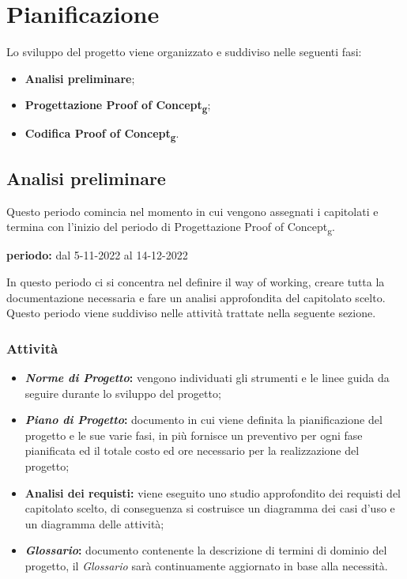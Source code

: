 \section{Pianificazione}
Lo sviluppo del progetto viene organizzato e suddiviso nelle seguenti fasi:
\begin{itemize}
\item \textbf{Analisi preliminare};
\item \textbf{Progettazione Proof of Concept\textsubscript{g}};
\item \textbf{Codifica Proof of Concept\textsubscript{g}}.
\end{itemize}


\subsection{Analisi preliminare}
Questo periodo comincia nel momento in cui vengono assegnati i capitolati e termina con l'inizio del periodo di Progettazione Proof of Concept\textsubscript{g}.\\
\begin{center}
\textbf{periodo:} dal 5-11-2022 al 14-12-2022\\
\end{center}
In questo periodo ci si concentra nel definire il way of working, creare tutta la documentazione necessaria e fare un analisi approfondita del capitolato scelto.  Questo periodo viene suddiviso nelle attività trattate nella seguente sezione.

\subsubsection{Attività}
\begin{itemize}
\item \textbf{\textit{Norme di Progetto}:} vengono individuati gli strumenti e le linee guida da seguire durante lo sviluppo del progetto;
\item \textbf{\textit{Piano di Progetto}:} documento in cui viene definita la pianificazione del progetto e le sue varie fasi,  in più fornisce un preventivo per ogni fase pianificata ed il totale costo ed ore necessario per la realizzazione del progetto;
\item \textbf{Analisi dei requisti:} viene eseguito uno studio approfondito dei requisti del capitolato scelto,  di conseguenza si costruisce un diagramma dei casi d'uso e un diagramma delle attività;
\item \textbf{\textit{Glossario}: } documento contenente la descrizione di termini di dominio del progetto, il \textit{Glossario} sarà continuamente aggiornato in base alla necessità.
\end{itemize}

